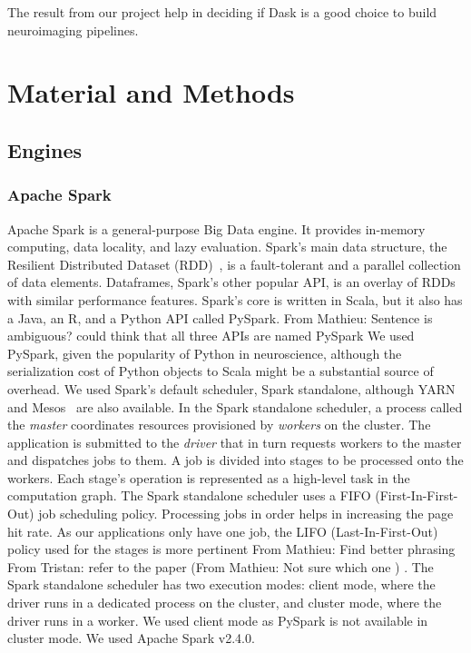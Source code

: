 \documentclass[conference]{IEEEtran}
\newcommand{\TG}[1]{\color{cyan}From Tristan: #1 \color{black}}
\newcommand{\MD}[1]{\color{magenta}From Mathieu: #1 \color{black}}
\begin{document}
The result from our project help in deciding if Dask is a good choice to build
neuroimaging pipelines.


\section{Material and Methods}

\subsection{Engines}

\subsubsection{Apache Spark} Apache Spark is a general-purpose Big Data engine. It
provides in-memory computing, data locality, and lazy evaluation. Spark's main data
structure, the Resilient Distributed Dataset (RDD)~\cite{RDD}, is a fault-tolerant
and a parallel collection of data elements. Dataframes, Spark's other popular API, is
an overlay of RDDs with similar performance features. Spark's core is written in
Scala, but it also has a Java, an R, and a Python API called PySpark. \MD{Sentence is
ambiguous? could think that all three APIs are named PySpark} We used PySpark, given
the popularity of Python in neuroscience, although the serialization cost of Python
objects to Scala might be a substantial source of overhead. We used Spark's default
scheduler, Spark standalone, although YARN~\cite{vavilapalli2013apache} and
Mesos~\cite{hindman2011mesos} are also available. In the Spark standalone scheduler,
a process called the \emph{master} coordinates resources provisioned by
\emph{workers} on the cluster. The application is submitted to the \emph{driver} that
in turn requests workers to the master and dispatches jobs to them. A job is divided
into stages to be processed onto the workers. Each stage's operation is represented
as a high-level task in the computation graph. The Spark standalone scheduler uses a
FIFO (First-In-First-Out) job scheduling policy. Processing jobs in order helps in
increasing the page hit rate. As our applications only have one job, the LIFO
(Last-In-First-Out) policy used for the stages is more pertinent \MD{Find better
phrasing} \TG{refer to the paper (\MD{Not sure which one})}. The Spark standalone
scheduler has two execution modes: client mode, where the driver runs in a dedicated
process on the cluster, and cluster mode, where the driver runs in a worker. We used
client mode as PySpark is not available in cluster mode. We used Apache Spark v2.4.0.
\end{document}
